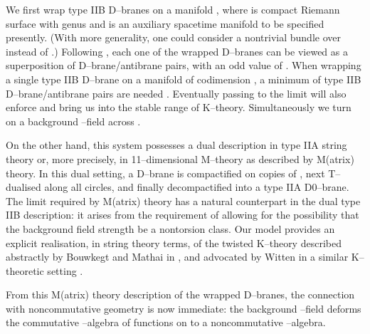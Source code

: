 \documentclass[a4paper,a4paper]{article}
\begin{document}
We first wrap \coordHE{} type IIB D\coordHE{}--branes on a manifold \coordHE{},
where \myHighlight{$\Sigma$}\coordHE{} is compact Riemann surface with genus \coordHE{} and \coordHE{} is an 
auxiliary spacetime manifold to be specified presently.
(With more generality, one could consider a nontrivial bundle over \myHighlight{$\Sigma$}\coordHE{}
instead of \coordHE{}.)
Following \cite{SEN}, each one of the \coordHE{} wrapped 
D\coordHE{}--branes can be viewed as a superposition  of \coordHE{} D\coordHE{}--brane/antibrane  pairs, 
with an odd value of \coordHE{}. When wrapping a single type IIB D\coordHE{}--brane on a manifold 
of codimension \coordHE{}, a minimum of \coordHE{} type IIB D\coordHE{}--brane/antibrane pairs 
are needed \cite{WITTENDK}. Eventually passing to the limit \coordHE{} 
will also enforce \coordHE{} and bring us into the stable range of K--theory. 
Simultaneously we turn on a background \coordHE{}--field across \myHighlight{$\Sigma$}\coordHE{}. 

On the other hand, this system possesses a dual description in type IIA  
string theory or, more precisely, in 11--dimensional M--theory as described  
by M(atrix) theory. In this dual setting, a D\coordHE{}--brane is compactified on
\coordHE{} copies of \coordHE{}, next T--dualised along all \coordHE{} circles, and
finally decompactified into a type IIA D0--brane. The limit  \coordHE{} 
required by M(atrix) theory has a natural counterpart in the dual type IIB 
description: it arises from the requirement of allowing for the possibility 
that the background field strength \coordHE{} be a nontorsion class.  
Our model provides an explicit realisation, in string theory terms,  
of the twisted K--theory described abstractly by Bouwkegt and Mathai 
in \cite{BOUWMATHAI}, and advocated by Witten in a similar 
K--theoretic setting \cite{WITMICHIGAN}. 

{}From this M(atrix) theory description of the wrapped D\coordHE{}--branes,  
the connection with noncommutative geometry \cite{NCG} is now immediate:
the background \coordHE{}--field deforms the commutative \coordHE{}--algebra of 
functions on \myHighlight{$\Sigma$}\coordHE{} to a noncommutative \coordHE{}--algebra.
  
\end{document}
